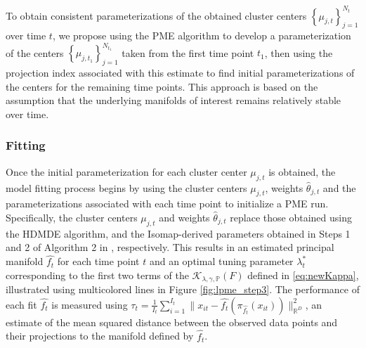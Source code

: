 \documentclass[12pt]{article}
\theoremstyle{definition}
\begin{document}
To obtain consistent parameterizations of the obtained cluster centers $\left\{\mu_{j, t}\right\}_{j=1}^{N_t}$ over time $t$, we propose using the PME algorithm to develop a parameterization of the centers $\left\{\mu_{j, t_1}\right\}_{j=1}^{N_{t_1}}$ taken from the first time point $t_1$, then using the projection index associated with this estimate to find initial parameterizations of the centers for the remaining time points. This approach is based on the assumption that the underlying manifolds of interest remains relatively stable over time. %

\subsubsection{Fitting}

Once the initial parameterization for each cluster center $\mu_{j, t}$ is obtained, the model fitting process begins by using the cluster centers $\mu_{j, t}$, weights $\hat{\theta}_{j, t}$ and the parameterizations associated with each time point to initialize a PME run. Specifically, the cluster centers $\mu_{j, t}$ and weights $\hat{\theta}_{j, t}$ replace those obtained using the HDMDE algorithm, and the Isomap-derived parameters obtained in Steps 1 and 2 of Algorithm 2 in \cite{mengPrincipalManifoldEstimation2021}, respectively.
This results in an estimated principal manifold $\widehat{f_t}$ for each time point $t$ and an optimal tuning parameter $\lambda_t^*$ corresponding to the first two terms of the $\mathcal{K}_{\lambda, \gamma, \mathbb{P}}(F)$ defined in \eqref{eq:newKappa}, illustrated using multicolored lines in Figure \ref{fig:lpme_step3}. The performance of each fit $\widehat{f_t}$ is measured using $\tau_t = \frac{1}{I_t}\sum_{i=1}^{I_t}\| x_{it} - \widehat{f_t}(\pi_{\widehat{f_t}}(x_{it}))\|^{2}_{\mathbb{R}^D}$, an estimate of the mean squared distance between the observed data points and their projections to the manifold defined by $\widehat{f_t}$. 
\end{document}
